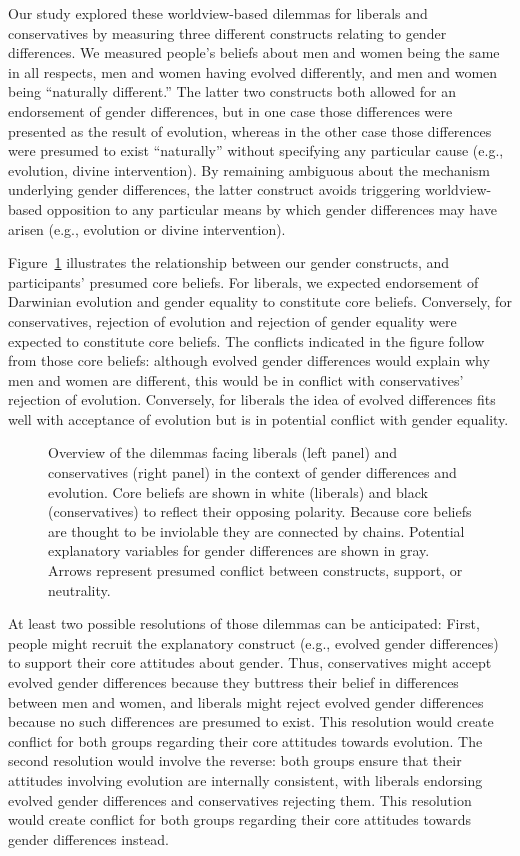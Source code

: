 \documentclass[fignum,man]{apa}\usepackage[]{graphicx}\usepackage[]{color}
\begin{document}
Our study explored these worldview-based dilemmas for
liberals and conservatives by measuring 
three different constructs relating to gender differences.
We measured
people's beliefs about men and women being the same in all
respects, men and women having evolved differently,
and men and women being ``naturally different.'' 
The latter two constructs both allowed for an endorsement
of gender differences, 
but in one case those differences were presented as the result of evolution, 
whereas in the other case those differences were presumed to exist ``naturally'' 
without specifying any particular cause (e.g., evolution, divine intervention).
By remaining ambiguous about the mechanism underlying
gender differences, the latter construct 
avoids triggering worldview-based opposition to any
particular means by which gender differences may have arisen 
(e.g., evolution or divine intervention).

Figure~\ref{fig:dilemmas} illustrates the relationship
between our gender constructs, and participants' presumed
core beliefs. For liberals, we expected endorsement of
Darwinian evolution and gender equality to constitute core beliefs. Conversely,
for conservatives, rejection of evolution and rejection of 
gender equality were expected to constitute core beliefs.
The conflicts indicated in the figure follow from those core
beliefs: although evolved gender differences would explain
why men and women are different, this would be in conflict with
conservatives' rejection of evolution. Conversely,
for liberals the idea of evolved differences fits
well with acceptance of evolution but is in potential conflict with 
gender equality.
\begin{figure}[tp] %
	\caption{Overview of the dilemmas facing liberals (left panel) and conservatives
	(right panel) in the context of gender differences and evolution. Core beliefs
    are shown in white (liberals) and black (conservatives) to reflect their
	opposing polarity. Because core beliefs are thought to be inviolable
	they are connected by chains. Potential explanatory variables for gender
	differences are shown in gray. Arrows represent presumed conflict between constructs,
	support, or neutrality. }
	\label{fig:dilemmas}
\end{figure}

At least two possible resolutions of those dilemmas can be anticipated:
First, people might recruit the explanatory construct (e.g., evolved
gender differences) to support their core attitudes about gender. Thus,
conservatives might accept evolved gender differences because they buttress
their belief in differences between men and women, and liberals might
reject evolved gender differences because no such differences are presumed to exist.
This resolution would create conflict for both groups regarding their core attitudes
towards evolution. The second resolution would involve the reverse: both groups 
ensure that their attitudes involving evolution are internally consistent, 
with liberals endorsing
evolved gender differences and conservatives rejecting them. This resolution 
would create conflict for both groups regarding their core attitudes towards 
gender differences instead.
\end{document}
